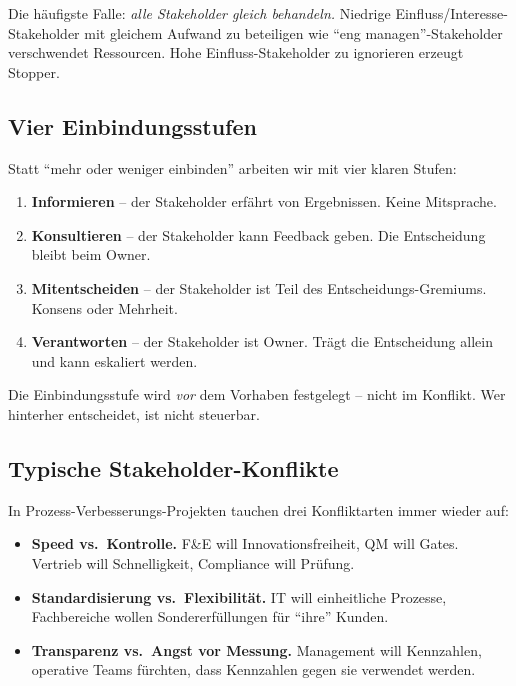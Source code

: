 \documentclass[11pt,a4paper,oneside]{article}
\newcommand{\fachbegriff}[1]{\textbf{#1}}
\begin{document}
\medskip

\noindent Die häufigste Falle: \emph{alle Stakeholder gleich behandeln.} Niedrige Einfluss/Interesse-Stakeholder mit gleichem Aufwand zu beteiligen wie ``eng managen''-Stakeholder verschwendet Ressourcen. Hohe Einfluss-Stakeholder zu ignorieren erzeugt Stopper.

\subsection{Vier Einbindungsstufen}

Statt ``mehr oder weniger einbinden'' arbeiten wir mit vier klaren Stufen:

\begin{enumerate}
  \item \fachbegriff{Informieren} -- der Stakeholder erfährt von Ergebnissen. Keine Mitsprache.
  \item \fachbegriff{Konsultieren} -- der Stakeholder kann Feedback geben. Die Entscheidung bleibt beim Owner.
  \item \fachbegriff{Mitentscheiden} -- der Stakeholder ist Teil des Entscheidungs-Gremiums. Konsens oder Mehrheit.
  \item \fachbegriff{Verantworten} -- der Stakeholder ist Owner. Trägt die Entscheidung allein und kann eskaliert werden.
\end{enumerate}

Die Einbindungsstufe wird \emph{vor} dem Vorhaben festgelegt -- nicht im Konflikt. Wer hinterher entscheidet, ist nicht steuerbar.

\subsection{Typische Stakeholder-Konflikte}

In Prozess-Verbesserungs-Projekten tauchen drei Konfliktarten immer wieder auf:

\begin{itemize}
  \item \fachbegriff{Speed vs.\ Kontrolle.} F\&E will Innovationsfreiheit, QM will Gates. Vertrieb will Schnelligkeit, Compliance will Prüfung.
  \item \fachbegriff{Standardisierung vs.\ Flexibilität.} IT will einheitliche Prozesse, Fachbereiche wollen Sondererfüllungen für ``ihre'' Kunden.
  \item \fachbegriff{Transparenz vs.\ Angst vor Messung.} Management will Kennzahlen, operative Teams fürchten, dass Kennzahlen gegen sie verwendet werden.
\end{itemize}
\end{document}
